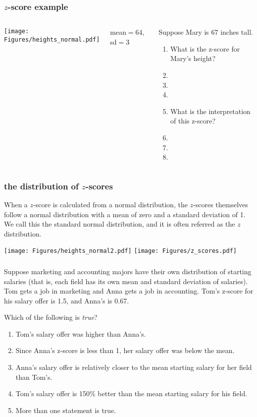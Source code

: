 \begin{frame}
\frametitle{$z$-score example}
\begin{columns}
\texttt{[image: Figures/heights\_normal.pdf]}\\
\begin{center}
mean$=64$, sd$=3$
\end{center}
\begin{clicker}{Suppose Mary is 67 inches tall.}
\begin{enumerate}
    \item
    What is the z-score for Mary's height?
    \item[]
    \item[]
    \item[]
    \item
    What is the interpretation of this z-score?
    \item[]
    \item[]
    \item[]
\end{enumerate}
\end{clicker}
\end{columns}
\end{frame}

\begin{frame}
\frametitle{the distribution of $z$-scores}
When a $z$-score is calculated from a normal distribution, the $z$-scores themselves follow a normal distribution with a mean of zero and a standard deviation of 1.  We call this the standard normal distribution, and it is often referred as the $z$ distribution.
\begin{center}
\texttt{[image: Figures/heights\_normal2.pdf]}
\texttt{[image: Figures/z\_scores.pdf]}
\end{center}
\end{frame}


\begin{frame}
\frametitle{\grp}
Suppose marketing and accounting majors have their own distribution of starting salaries (that is, each field has its own mean and standard deviation of salaries).  Tom gets a job in marketing and Anna gets a job in accounting.  Tom's z-score for his salary offer is 1.5, and Anna's is 0.67.
\begin{clicker}{Which of the following is \emph{true}?}
\begin{enumerate}
    \item
    Tom's salary offer was higher than Anna's.
    \item
    Since Anna's z-score is less than 1, her salary offer was below the mean.
    \item
    Anna's salary offer is relatively closer to the mean starting salary for her field than Tom's.
    \item
    Tom's salary offer is 150\% better than the mean starting salary for his field.
    \item
    More than one statement is true.
\end{enumerate}
\end{clicker}
\end{frame}

